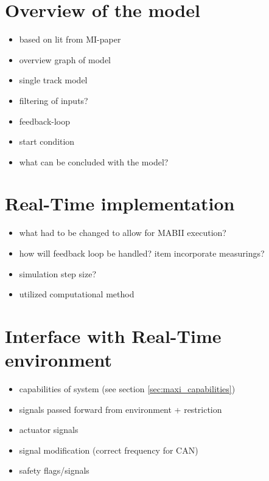 \documentclass[ExampleMasters.tex]{subfiles}
\begin{document}
\section{Overview of the model}
\label{sec:overview_of_the_model}
			
\begin{itemize}
	\item based on lit from MI-paper 
	\item overview graph of model
	\item single track model
	
	\item filtering of inputs?
	\item feedback-loop
	\item start condition
	\item what can be concluded with the model?
\end{itemize}



\section{Real-Time implementation}
\label{sec:real_time_implementation}

\begin{itemize}
	\item what had to be changed to allow for MABII execution?
	\item how will feedback loop be handled?
	item incorporate measurings?
	\item simulation step size?
	\item utilized computational method
\end{itemize}

\section{Interface with Real-Time environment}
\label{sec:interface_with_real_time}

\begin{itemize}
	\item capabilities of system (see section \ref{sec:maxi_capabilities})
	\item signals passed forward from environment + restriction
	
	\item actuator signals
	\item signal modification (correct frequency for CAN)
	\item safety flags/signals
	
\end{itemize}
\end{document}
